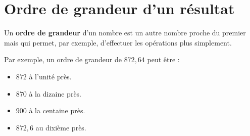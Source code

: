 \section{Ordre de grandeur d'un résultat}
\begin{definition}
    Un \textbf{ordre de grandeur} d'un nombre est un autre nombre proche du premier mais qui permet, par exemple, d'effectuer les opérations plus simplement.
\end{definition}

\begin{remarque}
    
    Par exemple, un ordre de grandeur de $872,64$ peut être :
    \begin{multicols}{2}
        \begin{itemize}
            \item $872$ à l'unité près.
            \item $870$ à la dizaine près.
            \item $900$ à la centaine près.
            \item $872,6$ au dixième près.
        \end{itemize}
    \end{multicols}
\end{remarque}

